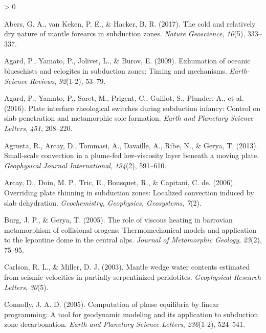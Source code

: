 \documentclass[draft,linenumbers]{agujournal2018}
\newlength{\cslhangindent}
\newenvironment{CSLReferences}[2] %
 {%
  \setlength{\parindent}{0pt}
  \ifodd #1 \everypar{\setlength{\hangindent}{\cslhangindent}}\ignorespaces\fi
  \ifnum #2 > 0
  \setlength{\parskip}{#2\baselineskip}
  \fi
 }%
 {}
\begin{document}
\hypertarget{refs}{}
\begin{CSLReferences}{1}{0}
\leavevmode{}%
Abers, G. A., van Keken, P. E., \& Hacker, B. R. (2017). {The cold and
relatively dry nature of mantle forearcs in subduction zones}.
\emph{Nature Geoscience}, \emph{10}(5), 333--337.

\leavevmode{}%
Agard, P., Yamato, P., Jolivet, L., \& Burov, E. (2009). {Exhumation of
oceanic blueschists and eclogites in subduction zones: Timing and
mechanisms}. \emph{Earth-Science Reviews}, \emph{92}(1-2), 53--79.

\leavevmode{}%
Agard, P., Yamato, P., Soret, M., Prigent, C., Guillot, S., Plunder, A.,
et al. (2016). {Plate interface rheological switches during subduction
infancy: Control on slab penetration and metamorphic sole formation}.
\emph{Earth and Planetary Science Letters}, \emph{451}, 208--220.

\leavevmode{}%
Agrusta, R., Arcay, D., Tommasi, A., Davaille, A., Ribe, N., \& Gerya,
T. (2013). {Small-scale convection in a plume-fed low-viscosity layer
beneath a moving plate}. \emph{Geophysical Journal International},
\emph{194}(2), 591--610.

\leavevmode{}%
Arcay, D., Doin, M. P., Tric, E., Bousquet, R., \& Capitani, C. de.
(2006). Overriding plate thinning in subduction zones: Localized
convection induced by slab dehydration. \emph{Geochemistry, Geophysics,
Geosystems}, \emph{7}(2).

\leavevmode{}%
Burg, J. P., \& Gerya, T. (2005). The role of viscous heating in
barrovian metamorphism of collisional orogens: Thermomechanical models
and application to the lepontine dome in the central alps. \emph{Journal
of Metamorphic Geology}, \emph{23}(2), 75--95.

\leavevmode{}%
Carlson, R. L., \& Miller, D. J. (2003). Mantle wedge water contents
estimated from seismic velocities in partially serpentinized
peridotites. \emph{Geophysical Research Letters}, \emph{30}(5).

\leavevmode{}%
Connolly, J. A. D. (2005). {Computation of phase equilibria by linear
programming: A tool for geodynamic modeling and its application to
subduction zone decarbonation}. \emph{Earth and Planetary Science
Letters}, \emph{236}(1-2), 524--541.


\end{CSLReferences}
\end{document}
